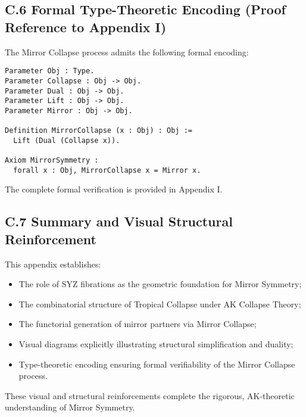 \documentclass[11pt]{article}
\begin{document}
\subsection*{C.6 Formal Type-Theoretic Encoding (Proof Reference to Appendix I)}

The Mirror Collapse process admits the following formal encoding:

\begin{lstlisting}[language=Coq, caption=Mirror Collapse Encoding]
Parameter Obj : Type.
Parameter Collapse : Obj -> Obj.
Parameter Dual : Obj -> Obj.
Parameter Lift : Obj -> Obj.
Parameter Mirror : Obj -> Obj.

Definition MirrorCollapse (x : Obj) : Obj :=
  Lift (Dual (Collapse x)).

Axiom MirrorSymmetry :
  forall x : Obj, MirrorCollapse x = Mirror x.
\end{lstlisting}

The complete formal verification is provided in Appendix I.

\subsection*{C.7 Summary and Visual Structural Reinforcement}

This appendix establishes:

\begin{itemize}
    \item The role of SYZ fibrations as the geometric foundation for Mirror Symmetry;
    \item The combinatorial structure of Tropical Collapse under AK Collapse Theory;
    \item The functorial generation of mirror partners via Mirror Collapse;
    \item Visual diagrams explicitly illustrating structural simplification and duality;
    \item Type-theoretic encoding ensuring formal verifiability of the Mirror Collapse process.
\end{itemize}

These visual and structural reinforcements complete the rigorous, AK-theoretic understanding of Mirror Symmetry.

\FloatBarrier



\end{document}
